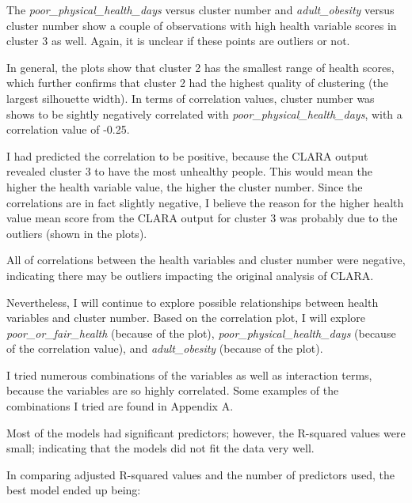 \documentclass[12pt,twoside]{amherstthesis}
\begin{document}
  The \emph{poor\_physical\_health\_days} versus cluster number and
  \emph{adult\_obesity} versus cluster number show a couple of
  observations with high health variable scores in cluster 3 as well.
  Again, it is unclear if these points are outliers or not.
  
  In general, the plots show that cluster 2 has the smallest range of
  health scores, which further confirms that cluster 2 had the highest
  quality of clustering (the largest silhouette width). In terms of
  correlation values, cluster number was shows to be sightly negatively
  correlated with \emph{poor\_physical\_health\_days}, with a correlation
  value of -0.25.
  
  I had predicted the correlation to be positive, because the CLARA output
  revealed cluster 3 to have the most unhealthy people. This would mean
  the higher the health variable value, the higher the cluster number.
  Since the correlations are in fact slightly negative, I believe the
  reason for the higher health value mean score from the CLARA output for
  cluster 3 was probably due to the outliers (shown in the plots).
  
  All of correlations between the health variables and cluster number were
  negative, indicating there may be outliers impacting the original
  analysis of CLARA.
  
  Nevertheless, I will continue to explore possible relationships between
  health variables and cluster number. Based on the correlation plot, I
  will explore \emph{poor\_or\_fair\_health} (because of the plot),
  \emph{poor\_physical\_health\_days} (because of the correlation value),
  and \emph{adult\_obesity} (because of the plot).
  
  I tried numerous combinations of the variables as well as interaction
  terms, because the variables are so highly correlated. Some examples of
  the combinations I tried are found in Appendix A.
  
  Most of the models had significant predictors; however, the R-squared
  values were small; indicating that the models did not fit the data very
  well.
  
  In comparing adjusted R-squared values and the number of predictors
  used, the best model ended up being:
  
  \begin{Shaded}
  \begin{Highlighting}[]
  \end{Highlighting}
  \end{Shaded}
  
\end{document}
